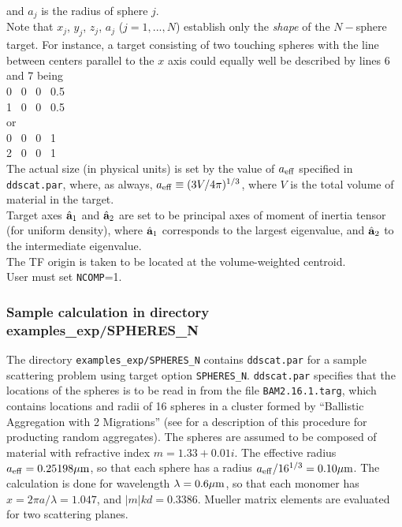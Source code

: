 	and $a_j$ is the radius of sphere $j$.\\
	Note that $x_j$, $y_j$, $z_j$, $a_j$ ($j=1,...,N$) establish only
	the {\it shape} of the $N-$sphere target.  For instance,
	a target consisting of two touching spheres with the line between
	centers parallel to the $x$ axis could equally well be
	described by lines 6 and 7 being\\
	 0 ~0 ~0 ~0.5\\
	 1 ~0 ~0 ~0.5\\
	or\\
	 0 ~0 ~0 ~1\\
	 2 ~0 ~0 ~1\\
	The actual size (in physical units) is set by the value
	of $a_{\rm eff}$ specified in {\tt ddscat.par}, where, as
	always, $a_{\rm eff}\equiv (3 V/4\pi)^{1/3}$, where $V$ is the
	total volume of material in the target.\\
	Target axes $\hat{\bf a}_1$ and $\hat{\bf a}_2$ are set to
	be principal axes of moment of inertia tensor (for uniform density), 
	where $\hat{\bf a}_1$
	corresponds to the largest eigenvalue, and $\hat{\bf a}_2$ to the
	intermediate eigenvalue.\\
	The TF origin is taken to be located at the volume-weighted
	centroid.\\
	User must set {\tt NCOMP}=1.

\subsubsection{\label{sec:example SPHERES_N}
               \bf Sample calculation in directory
               examples\_exp/SPHERES\_N}

The directory {\tt examples\_exp/SPHERES\_N} contains {\tt ddscat.par}
for a sample scattering problem using target option {\tt SPHERES\_N}.
{\tt ddscat.par} specifies that the locations of the spheres is to be 
read in from the file {\tt BAM2.16.1.targ}, which contains locations and
radii of 16 spheres in a cluster formed by ``Ballistic Aggregation with 2
Migrations'' (see \citet{Shen+Draine+Johnson_2008} for a description of this
procedure for producting random aggregates).
The spheres are assumed to be composed of material with refractive
index $m=1.33+0.01i$.
The effective radius ${a}_{\rm eff}=0.25198{\mu{\rm m}}$, so that each sphere has
a radius ${a}_{\rm eff}/16^{1/3}=0.10{\mu{\rm m}}$.  The calculation is done
for wavelength $\lambda=0.6{\mu{\rm m}}$, so that each monomer has
$x=2\pi a/\lambda = 1.047$, and $|m|kd=0.3386$.
Mueller matrix elements are evaluated for
two scattering planes.


